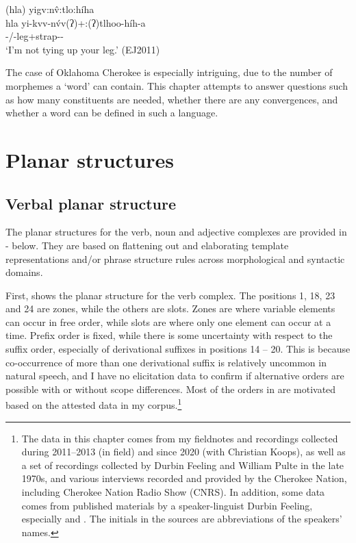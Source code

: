 \documentclass[output=paper]{langscibook}
\begin{document}
\ea\label{bkm:Ref72229021}(hla) yigv:n\^{v}:tlo:híha \\
    \gll hla yi-kvv-nv́v(ʔ)+:(ʔ)tlhoo-híh-a\\
     \Neg{} \Irr{}-\First{}/\Second\Sg{}-leg+strap-\Prs{}-\Ind{}\\
     \glt `I'm not tying up your leg.' (EJ2011)
\z

The case of Oklahoma Cherokee is especially intriguing, due to the number of morphemes a `word' can contain. This chapter attempts to answer questions such as how many constituents are needed, whether there are any convergences, and whether a word can be defined in such a language.

\section{Planar structures} 
\label{sec:key:2}
\subsection{Verbal planar structure}

The planar structures for the verb, noun and adjective complexes are provided in - below. They are based on flattening out and elaborating template representations and/or phrase structure rules across morphological and syntactic domains.

First,  shows the planar structure for the verb complex. The positions 1, 18, 23 and 24 are zones, while the others are slots. Zones are where variable elements can occur in free order, while slots are where only one element can occur at a time. Prefix order is fixed, while there is some uncertainty with respect to the suffix order, especially of derivational suffixes in positions 14 – 20. This is because co-occurrence of more than one derivational suffix is relatively uncommon in natural speech, and I have no elicitation data to confirm if alternative orders are possible with or without scope differences. Most of the orders in  are motivated based on the attested data in my corpus.\footnote{The data in this chapter comes from my fieldnotes and recordings collected during 2011--2013 (in field) and since 2020 (with Christian Koops), as well as a set of recordings collected by Durbin Feeling and William Pulte in the late 1970s, and various interviews recorded and provided by the Cherokee Nation, including Cherokee Nation Radio Show (CNRS). In addition, some data comes from published materials by a speaker-linguist Durbin Feeling, especially \citet{Feeling1975} and \citet{FeelingEtAl2003}. The initials in the sources are abbreviations of the speakers' names.}
\end{document}
